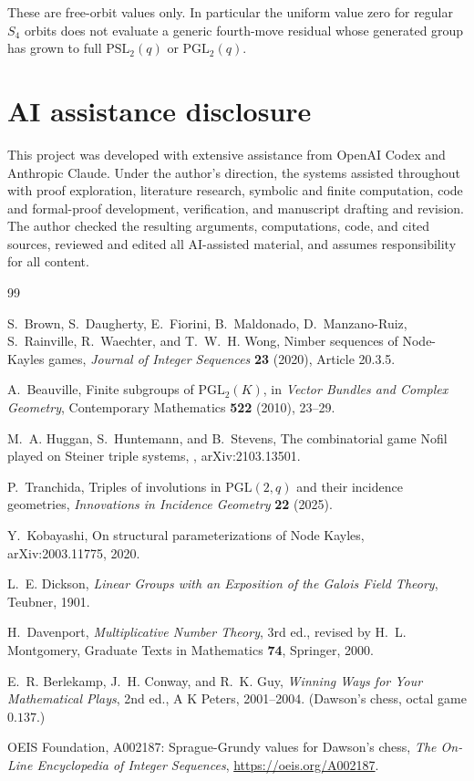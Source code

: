 \documentclass[11pt]{article}
\theoremstyle{definition}
\theoremstyle{remark}
\newcommand{\PGL}{\mathrm{PGL}}
\newcommand{\PSL}{\mathrm{PSL}}
\begin{document}
These are free-orbit values only. In particular the uniform value zero for regular $S_4$ orbits does
not evaluate a generic fourth-move residual whose generated group has grown to full $\PSL_2(q)$ or
$\PGL_2(q)$.

\section*{AI assistance disclosure}

This project was developed with extensive assistance from OpenAI Codex and
Anthropic Claude. Under the author's direction, the systems assisted
throughout with proof exploration, literature research, symbolic and finite
computation, code and formal-proof development, verification, and manuscript
drafting and revision. The author checked the resulting arguments,
computations, code, and cited sources, reviewed and edited all AI-assisted
material, and assumes responsibility for all content.

\begin{thebibliography}{99}

S.~Brown, S.~Daugherty, E.~Fiorini, B.~Maldonado, D.~Manzano-Ruiz, S.~Rainville, R.~Waechter, and
T.~W.~H. Wong,
\newblock Nimber sequences of Node-Kayles games,
\newblock \emph{Journal of Integer Sequences} \textbf{23} (2020), Article 20.3.5.

A.~Beauville,
\newblock Finite subgroups of $\PGL_2(K)$,
\newblock in \emph{Vector Bundles and Complex Geometry}, Contemporary Mathematics \textbf{522}
(2010), 23--29.

M.~A. Huggan, S.~Huntemann, and B.~Stevens,
\newblock The combinatorial game Nofil played on Steiner triple systems,
, arXiv:2103.13501.

P.~Tranchida,
\newblock Triples of involutions in $\PGL(2,q)$ and their incidence geometries,
\newblock \emph{Innovations in Incidence Geometry} \textbf{22} (2025).

Y.~Kobayashi, On structural parameterizations of Node Kayles, arXiv:2003.11775, 2020.

L.~E. Dickson,
\newblock \emph{Linear Groups with an Exposition of the Galois Field Theory},
\newblock Teubner, 1901.

H.~Davenport,
\newblock \emph{Multiplicative Number Theory}, 3rd ed., revised by H.~L. Montgomery,
\newblock Graduate Texts in Mathematics \textbf{74}, Springer, 2000.

E.~R. Berlekamp, J.~H. Conway, and R.~K. Guy,
\newblock \emph{Winning Ways for Your Mathematical Plays}, 2nd ed.,
\newblock A K Peters, 2001--2004. (Dawson's chess, octal game $0.137$.)

OEIS Foundation,
\newblock A002187: Sprague-Grundy values for Dawson's chess,
\newblock \emph{The On-Line Encyclopedia of Integer Sequences},
\newblock \url{https://oeis.org/A002187}.

\end{thebibliography}
\end{document}
